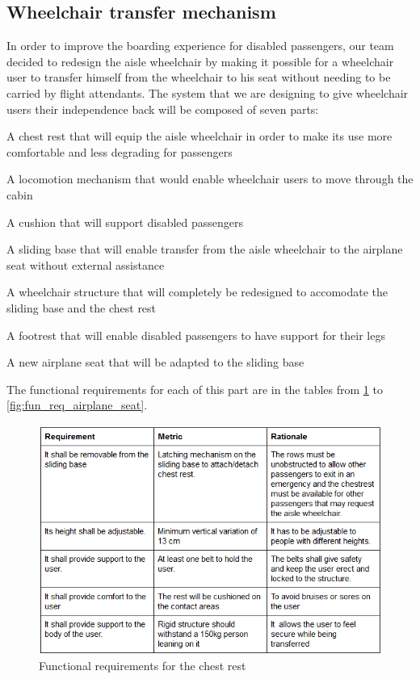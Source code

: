 \newpage

\subsection*{Wheelchair transfer mechanism}

In order to improve the boarding experience for disabled passengers, our team decided to redesign the aisle wheelchair by making it possible for a wheelchair user to transfer himself from the wheelchair to his seat without needing to be carried by flight attendants. The system that we are designing to give wheelchair users their independence back will be composed of seven parts:

\begin{list}{-}{}
  \item A chest rest that will equip the aisle wheelchair in order to make its use more comfortable and less degrading for passengers
  \item A locomotion mechanism that would enable wheelchair users to move through the cabin
  \item A cushion that will support disabled passengers
  \item A sliding base that will enable transfer from the aisle wheelchair to the airplane seat without external assistance
  \item A wheelchair structure that will completely be redesigned to accomodate the sliding base and the chest rest
  \item A footrest that will enable disabled passengers to have support for their legs
  \item A new airplane seat that will be adapted to the sliding base
\end{list}

The functional requirements for each of this part are in the tables from \ref{fig:fun_req_chest_rest} to \ref{fig:fun_req_airplane_seat}.

\newpage

\begin{figure}[h!]
  \centering
     \includegraphics[scale=1]{images/functional_requirements_chest_rest.png}
   \caption{Functional requirements for the chest rest}
  \label{fig:fun_req_chest_rest}
\end{figure}

